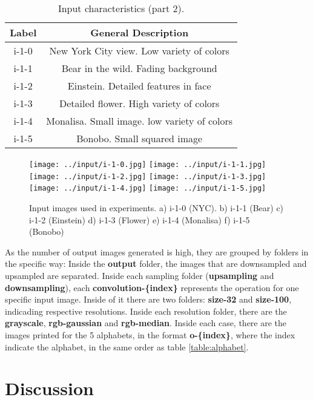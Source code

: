 \documentclass[]{IEEEtran}
\begin{document}
\begin{table}[H]
\centering
\begin{tabular}{ |c|c| } 
 \hline
 Label & General Description\\
 \hline
 i-1-0 & New York City view. Low variety of colors\\  
 \hline
 i-1-1 & Bear in the wild. Fading background\\
 \hline
 i-1-2 & Einstein. Detailed features in face \\
 \hline
 i-1-3 & Detailed flower. High variety of colors \\
 \hline
 i-1-4 & Monalisa. Small image. low variety of colors \\
 \hline
 i-1-5 & Bonobo. Small squared image \\
 \hline
\end{tabular}
 \label{table:inputs-2}
 \caption{Input characteristics (part 2).}
\end{table}

\begin{figure}[H]
    \centering
    \texttt{[image: ../input/i-1-0.jpg]}
    \texttt{[image: ../input/i-1-1.jpg]}
    \texttt{[image: ../input/i-1-2.jpg]}
    \texttt{[image: ../input/i-1-3.jpg]}
    \texttt{[image: ../input/i-1-4.jpg]}
    \texttt{[image: ../input/i-1-5.jpg]}
    \caption{Input images used in experiments. a) i-1-0 (NYC). b) i-1-1 (Bear) c) i-1-2 (Einstein) d) i-1-3 (Flower) e) i-1-4 (Monalisa) f) i-1-5 (Bonobo)}
    \label{fig:input-images}
\end{figure}

As the number of output images generated is high, they are grouped by folders in the specific way: Inside the \textbf{output} folder, the images that are downsampled and upsampled are separated. Inside each sampling folder (\textbf{upsampling} and \textbf{downsampling}), each \textbf{convolution-\{index\}} represents the operation for one specific input image. Inside of it there are two folders: \textbf{size-32} and \textbf{size-100}, indicading respective resolutions. Inside each resolution folder, there are the \textbf{grayscale}, \textbf{rgb-gaussian} and \textbf{rgb-median}. Inside each case, there are the images printed for the 5 alphabets, in the format \textbf{o-\{index\}}, where the index indicate the alphabet, in the same order as table \ref{table:alphabet}.  

\section{Discussion}
\end{document}
